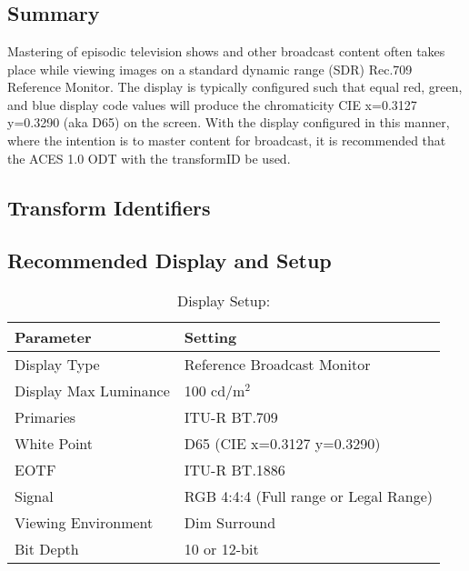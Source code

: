 \section[Rec709]{\shortName{}}
\label{sec:odt-details-\id}

\subsection{Summary}
\label{subsec:summary-\id}

Mastering of episodic television shows and other broadcast content often takes place while viewing images on a standard dynamic range (SDR) Rec.709  Reference Monitor. The display is typically configured such that equal red, green, and blue display code values will produce the chromaticity CIE x=0.3127 y=0.3290 (aka D65) on the screen. With the display configured in this manner, where the intention is to master content for broadcast, it is recommended that the ACES 1.0 ODT with the transformID \texttt{} be used.

\subsection{Transform Identifiers} 
\label{subsec:odt-ident-\id}

\subsection{Recommended Display and Setup}
\label{subsec:setup-\id}

\begin{table}[ht!]
    \centering
        \begin{tabular}{|p{1.5in}|p{3in}|}
            \hline
            \textbf{Parameter} 		& 	\textbf{Setting} 				 		\\ \hline
            Display Type 			&	Reference Broadcast Monitor				\\ \hline
            Display Max Luminance 	& 	100 cd/m$^2$							\\ \hline
            Primaries	 			& 	ITU-R BT.709							\\ \hline
            White Point	 			& 	D65 (CIE x=0.3127 y=0.3290)				\\ \hline
            EOTF					& 	ITU-R BT.1886		 					\\ \hline
            Signal 					&	RGB 4:4:4 (Full range or Legal Range)	\\ \hline
            Viewing Environment 	& 	Dim Surround							\\ \hline
            Bit Depth 				& 	10 or 12-bit	 						\\ \hline 
    \end{tabular}
    \caption{Display Setup: \shortName{}} 
    \label{tab:setup-\id}
\end{table}


